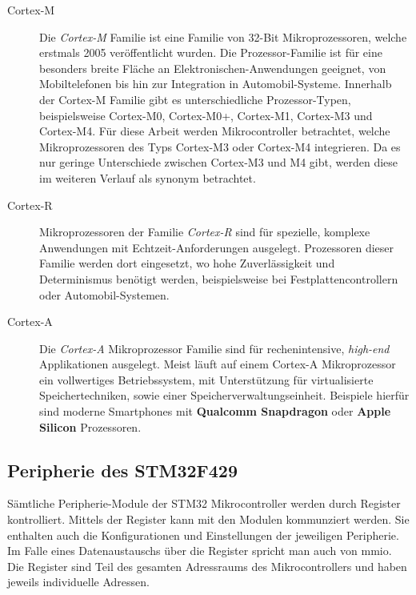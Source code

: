 \begin{description}
    \item[Cortex-M]
    Die \textit{Cortex-M} Familie ist eine Familie von 32-Bit Mikroprozessoren,
    welche erstmals 2005 veröffentlicht wurden\cite{DefGuideCM34_JYiu}.
    Die Prozessor-Familie ist für eine besonders breite Fläche an
    Elektronischen-Anwendungen geeignet, von Mobiltelefonen bis hin zur
    Integration in Automobil-Systeme.
    Innerhalb der Cortex-M Familie gibt es unterschiedliche Prozessor-Typen,
    beispielsweise Cortex-M0, Cortex-M0+, Cortex-M1, Cortex-M3 und
    Cortex-M4\cite{DefGuideCM34_JYiu}.
    Für diese Arbeit werden Mikrocontroller betrachtet, welche Mikroprozessoren
    des Typs Cortex-M3 oder Cortex-M4 integrieren.
    Da es nur geringe Unterschiede zwischen Cortex-M3 und M4 gibt, werden diese
    im weiteren Verlauf als synonym betrachtet.
    \item[Cortex-R] 
    Mikroprozessoren der Familie \textit{Cortex-R} sind für spezielle, komplexe
    Anwendungen mit Echtzeit-Anforderungen ausgelegt.
    Prozessoren dieser Familie werden dort eingesetzt, wo hohe Zuverlässigkeit
    und Determinismus benötigt werden, beispielsweise bei
    Festplattencontrollern oder Automobil-Systemen\cite{DefGuideCM34_JYiu}.
    \item[Cortex-A] 
    Die \textit{Cortex-A} Mikroprozessor Familie sind für rechenintensive,
    \textit{high-end} Applikationen ausgelegt.
    Meist läuft auf einem Cortex-A Mikroprozessor ein vollwertiges
    Betriebssystem, mit Unterstützung für virtualisierte Speichertechniken,
    sowie einer Speicherverwaltungseinheit\cite{DefGuideCM34_JYiu}.
    Beispiele hierfür sind moderne Smartphones mit \textbf{Qualcomm Snapdragon}
    oder \textbf{Apple Silicon} Prozessoren.
\end{description}

\subsection{Peripherie des STM32F429}
\label{sec:theo-basics-periphery-stm32f4}

Sämtliche Peripherie-Module der STM32 Mikrocontroller werden durch Register
kontrolliert.
Mittels der Register kann mit den Modulen kommunziert werden.
Sie enthalten auch die Konfigurationen und Einstellungen der jeweiligen
Peripherie.
Im Falle eines Datenaustauschs über die Register spricht man auch von
\ac{mmio}.
Die Register sind Teil des gesamten Adressraums des Mikrocontrollers und haben
jeweils individuelle Adressen.

